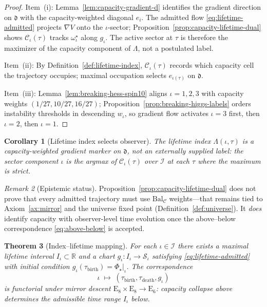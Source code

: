 \documentclass[11pt]{article}
\theoremstyle{plain}
\newtheorem{theorem}{Theorem}[section]
\newtheorem{corollary}[theorem]{Corollary}
\theoremstyle{definition}
\theoremstyle{remark}
\newtheorem{remark}[theorem]{Remark}
\numberwithin{equation}{section}
\newcommand{\E}[1]{\mathrm{E}_{#1}}
\newcommand{\capacity}{\mathcal{C}}
\newcommand{\orderparam}{\Phi}
\begin{document}
\begin{proof}
Item~(i): Lemma~\ref{lem:capacity-gradient-d} identifies the gradient
direction on $\mathfrak{d}$ with the capacity-weighted diagonal $e_i$. The
admitted flow \eqref{eq:lifetime-admitted} projects $\nabla V$ onto the
$\iota$-sector; Proposition~\ref{prop:capacity-lifetime-dual} shows
$\capacity_\iota(\tau)$ tracks $\omega^\star_\iota$ along $g_\iota$. The
active sector at $\tau$ is therefore the maximizer of the capacity component
of $\Lambda$, not a postulated label.

Item~(ii): By Definition~\ref{def:lifetime-index}, $\capacity_\iota(\tau)$
records which capacity cell the trajectory occupies; maximal occupation
selects $e_{\iota(\tau)}$ on $\mathfrak{d}$.

Item~(iii): Lemma~\ref{lem:breaking-hess-spin10} aligns
$\iota=1,2,3$ with capacity weights $(1/27,10/27,16/27)$;
Proposition~\ref{prop:breaking-higgs-labels} orders instability thresholds in
descending $w_\iota$, so gradient flow activates $\iota=3$ first, then
$\iota=2$, then $\iota=1$.
\end{proof}

\begin{corollary}[Lifetime index selects observer]\label{cor:iota-lambda}
The lifetime index $\Lambda(\iota,\tau)$ is a capacity-weighted gradient marker
on $\mathfrak{d}$, not an externally supplied label: the sector component
$\iota$ is the argmax of $\capacity_\iota(\tau)$ over $\mathcal{I}$ at each
$\tau$ where the maximum is strict.
\end{corollary}

\begin{remark}[Epistemic status]
Proposition~\ref{prop:capacity-lifetime-dual} does not prove that every
admitted trajectory must use $\mathrm{Bal}_{\mathcal{C}}$ weights---that
remains tied to Axiom~\ref{ax:mirror} and the universe fixed point
(Definition~\ref{def:universe}). It \emph{does} identify capacity with
observer-level time evolution once the above--below correspondence
\eqref{eq:above-below} is accepted.
\end{remark}

\begin{theorem}[Index--lifetime mapping]\label{thm:index-lifetime}
For each $\iota\in\mathcal{I}$ there exists a maximal lifetime interval
$I_\iota\subset\mathbb{R}$ and a chart $g_\iota:I_\iota\to\mathcal{S}_\iota$
satisfying \eqref{eq:lifetime-admitted} with initial condition
$g_\iota(\tau_{\mathrm{birth}})=\orderparam_\star|_\iota$.
The correspondence
\begin{equation}\label{eq:index-lifetime-bij}
  \iota \;\longmapsto\; (\tau_\mathrm{birth},\tau_\mathrm{death},g_\iota)
\end{equation}
is functorial under mirror descent $\E{8}\times\E{8}\to\E{6}$: capacity
collapse above determines the admissible time range $I_\iota$ below.
\end{theorem}
\end{document}

